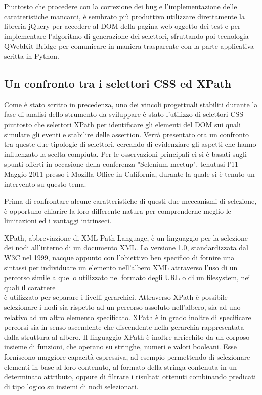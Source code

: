 \documentclass[12pt]{toptesi}
\begin{document}
Piuttosto che procedere con la correzione dei bug e l'implementazione delle caratteristiche mancanti, è sembrato più produttivo utilizzare direttamente la libreria jQuery per accedere al DOM della pagina web oggetto dei test e per implementare l'algoritmo di generazione dei selettori, sfruttando poi tecnologia QWebKit Bridge per comunicare in maniera trasparente con la parte applicativa scritta in Python.

\subsection{Un confronto tra i selettori CSS ed XPath}

Come è stato scritto in precedenza, uno dei vincoli progettuali stabiliti durante la fase di analisi dello strumento da sviluppare è stato l'utilizzo di selettori CSS piuttosto che selettori XPath per identificare gli elementi del DOM sui quali simulare gli eventi e stabilire delle assertion. Verrà presentato ora un confronto tra queste due tipologie di selettori, cercando di evidenziare gli aspetti che hanno influenzato la scelta compiuta. Per le osservazioni principali ci si è basati sugli spunti offerti in occasione della conferenza "Selenium meetup", tenutasi l'11 Maggio 2011 presso i Mozilla Office in California, durante la quale si è tenuto un intervento su questo tema.

Prima di confrontare alcune caratteristiche di questi due meccanismi di selezione, è opportuno chiarire la loro differente natura per comprenderne meglio le limitazioni ed i vantaggi intrinseci.

XPath, abbreviazione di XML Path Language, è un linguaggio per la selezione dei nodi all'interno di un documento XML. La versione 1.0, standardizzata dal W3C nel 1999, nacque appunto con l'obiettivo ben specifico di fornire una sintassi per individuare un elemento nell'albero XML attraverso l'uso di un percorso simile a quello utilizzato nel formato degli URL o di un filesystem, nei quali il carattere \\ è utilizzato per separare i livelli gerarchici. Attraverso XPath è possibile selezionare i nodi sia rispetto ad un percorso assoluto nell'albero, sia ad uno relativo ad un altro elemento specificato. XPath è in grado inoltre di specificare percorsi sia in senso ascendente che discendente nella gerarchia rappresentata dalla struttura al albero. Il linguaggio XPath è inoltre arricchito da un corposo insieme di funzioni, che operano su stringhe, numeri e valori booleani. Esse forniscono maggiore capacità espressiva, ad esempio permettendo di selezionare elementi in base al loro contenuto, al formato della stringa contenuta in un determinato attributo, oppure di filtrare i risultati ottenuti combinando predicati di tipo logico su insiemi di nodi selezionati.
\end{document}
